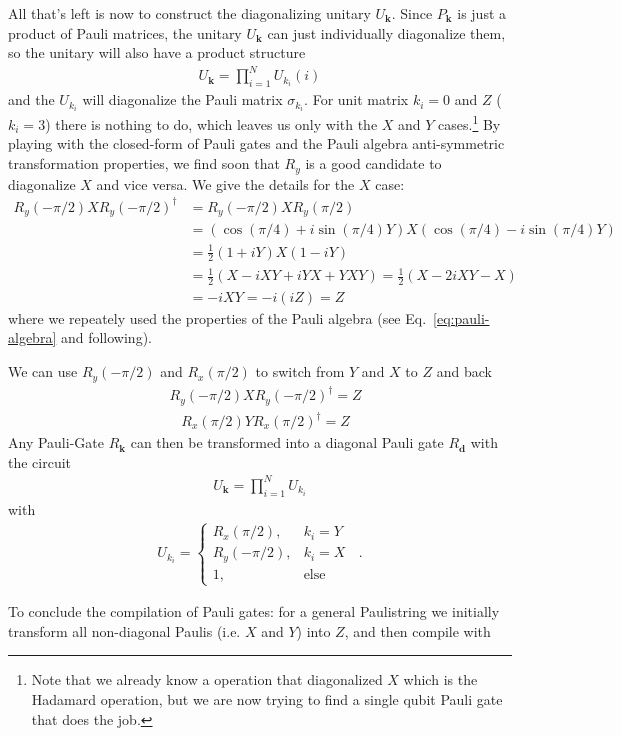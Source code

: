 All that's left is now to construct the diagonalizing unitary $U_\mathbf{k}$. 
Since $P_\mathbf{k}$ is just a product of Pauli matrices, the unitary $U_\mathbf{k}$ can just individually diagonalize them, so the unitary will also have a product structure
\begin{align}
    U_\mathbf{k} = \prod_{i=1}^N U_{k_i}(i)
\end{align}
and the $U_{k_i}$ will diagonalize the Pauli matrix $\sigma_{k_i}$. For unit matrix $k_i=0$ and $Z$ ($k_i=3$) there is nothing to do, which leaves us only with the $X$ and $Y$ cases.\footnote{Note that we already know a operation that diagonalized $X$ which is the Hadamard operation, but we are now trying to find a single qubit Pauli gate that does the job.}
By playing with the closed-form of Pauli gates and the Pauli algebra anti-symmetric transformation properties, we find soon that $R_y$ is a good candidate to diagonalize $X$ and vice versa. 
We give the details for the $X$ case:
\begin{align}
    R_y(-\pi/2) X R_y(-\pi/2)^\dagger &= R_y(-\pi/2) X R_y(\pi/2) \nonumber\\
    &= \left(\cos(\pi/4) + i\sin(\pi/4)Y  \right) X \left(\cos(\pi/4) - i\sin(\pi/4)Y  \right) \nonumber\\
    &= \frac{1}{{2}}\left(1 + iY \right) X \left(1 - i Y \right) \nonumber\\
    &= \frac{1}{2}\left(X -iXY + iYX + YXY\right) = \frac{1}{2}\left(X -2iXY - X\right)\nonumber\\
    &= -iXY = -i(iZ) = Z
 \end{align}
 where we repeately used the properties of the Pauli algebra (see Eq.~\eqref{eq:pauli-algebra} and following).
 \begin{algo*}
     We can use $R_y(-\pi/2)$ and $R_x(\pi/2)$ to switch from $Y$ and $X$ to $Z$ and back
     \begin{align}
         &R_y(-\pi/2) X R_y(-\pi/2)^\dagger = Z
    \end{align}
    \begin{align}
         &R_x(\pi/2) Y R_x(\pi/2)^\dagger = Z
     \end{align}
    Any Pauli-Gate $R_\mathbf{k}$ can then be transformed into a diagonal Pauli gate $R_\mathbf{d}$ with the circuit
    \begin{align}
        U_\mathbf{k} = \prod_{i=1}^N U_{k_i}
    \end{align}
    with
    \begin{align}
        U_{k_i} = \begin{cases}
            R_x(\pi/2), & k_i = Y\\
            R_y(-\pi/2), & k_i = X\\
            1, & \text{else}
        \end{cases}\;\;.
    \end{align}
 \end{algo*}
To conclude the compilation of Pauli gates: for a general Paulistring we initially transform all non-diagonal Paulis (i.e. $X$ and $Y$) into $Z$, and then compile with 


